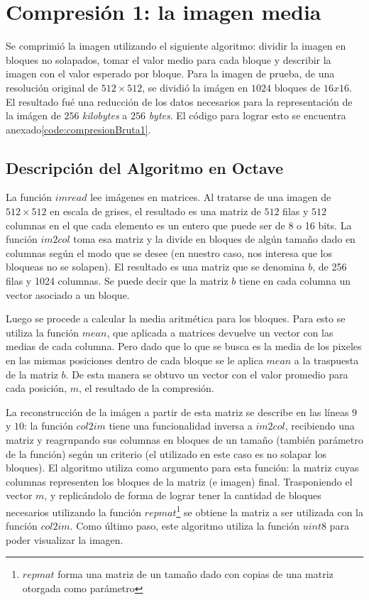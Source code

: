 \documentclass[twocolumn,a4paper,10pt]{article}
\begin{document}

\section{Compresi\'on 1: la imagen media}
\label{sec:compresion1}

Se comprimió la imagen utilizando el siguiente algoritmo: dividir la imagen en bloques no solapados, tomar el valor medio para cada bloque y describir la imagen con el valor esperado por bloque. Para la imagen de prueba, de una resolución original de $512 \times 512$, se dividió la imágen en $1024$ bloques de $16x16$. El resultado fué una reducción de los datos necesarios para la representación de la imágen de $256$ \textit{kilobytes} a $256$ \textit{bytes}. El código para lograr esto se encuentra anexado\ref{code:compresionBruta1}.

\subsection{Descripción del Algoritmo en Octave}

La funci\'on $imread$ lee im\'agenes en matrices. Al tratarse de una imagen de $512 \times 512$ en escala de grises, el resultado es una matriz de $512$ filas y $512$ columnas en el que cada elemento es un entero que puede ser de 8 o 16 bits. La funci\'on $im2col$ toma esa matriz y la divide en bloques de alg\'un tamaño dado en columnas seg\'un el modo que se desee (en nuestro caso, nos interesa que los bloqueas no se solapen). El resultado es una matriz que se denomina $b$, de 256 filas y 1024 columnas. Se puede decir que la matriz $b$ tiene en cada columna un vector asociado a un bloque. 

Luego se procede a calcular la media aritm\'etica para los bloques. Para esto se utiliza la funci\'on $mean$, que aplicada a matrices devuelve un vector con las medias de cada columna. Pero dado que lo que se busca es la media de los pixeles en las mismas posiciones dentro de cada bloque se le aplica $mean$ a la traspuesta de la matriz $b$. De esta manera se obtuvo un vector con el valor promedio para cada posición, $m$, el resultado de la compresión.

La reconstrucción de la imágen a partir de esta matriz se describe en las líneas $9$ y $10$: la función $col2im$ tiene una funcionalidad inversa a $im2col$, recibiendo una matriz y reagrupando sus columnas en bloques de un tamaño (también parámetro de la función) según un criterio (el utilizado en este caso es no solapar los bloques). El algoritmo utiliza como argumento para esta función: la matriz cuyas columnas representen los bloques de la matriz (e imagen) final. Trasponiendo el vector $m$, y replicándolo de forma de lograr tener la cantidad de bloques necesarios utilizando la funci\'on $repmat$\footnote{$repmat$ forma una matriz de un tamaño dado con copias de una matriz otorgada como parámetro} se obtiene la matriz a ser utilizada con la función $col2im$. Como último paso, este algoritmo utiliza la función $uint8$ para poder visualizar la imagen.
\end{document}
